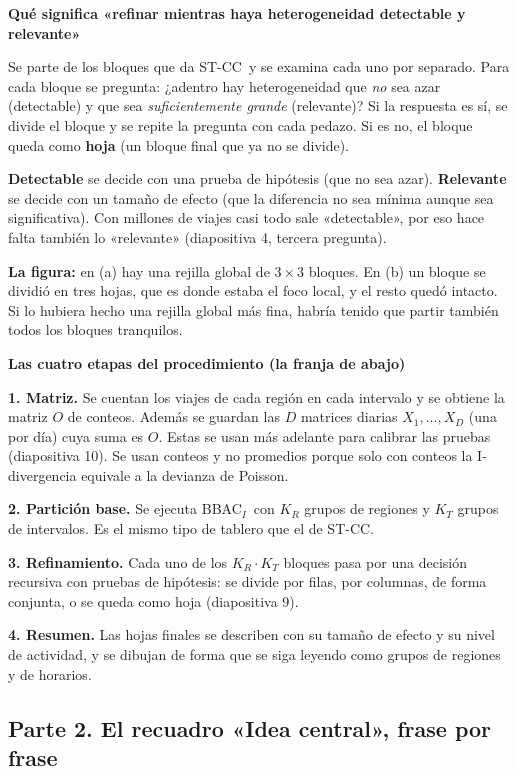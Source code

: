 \documentclass[11pt,a4paper]{article}
\newcommand{\cajainicio}[3]{\par\medskip\noindent
  \begin{lrbox}{\cajabox}\begin{minipage}{\dimexpr\linewidth-2\fboxsep-2\fboxrule\relax}%
  \textbf{\color{#1}#3}\par\smallskip}
\newcommand{\cajafin}[2]{\end{minipage}\end{lrbox}\fcolorbox{#1}{#2}{\usebox{\cajabox}}\par\medskip}
\newenvironment{nota}[1]{\cajainicio{acc}{acc!7}{#1}}{\cajafin{acc}{acc!7}}
\newcommand{\STCC}{ST-CC}
\newcommand{\BBAC}{BBAC$_I$}
\begin{document}
\begin{nota}{Qué significa «refinar mientras haya heterogeneidad detectable y relevante»}
Se parte de los bloques que da \STCC\ y se examina cada uno por separado. Para cada bloque se pregunta: ¿adentro hay heterogeneidad que \emph{no} sea azar (detectable) y que sea \emph{suficientemente grande} (relevante)? Si la respuesta es sí, se divide el bloque y se repite la pregunta con cada pedazo. Si es no, el bloque queda como \textbf{hoja} (un bloque final que ya no se divide).

\textbf{Detectable} se decide con una prueba de hipótesis (que no sea azar). \textbf{Relevante} se decide con un tamaño de efecto (que la diferencia no sea mínima aunque sea significativa). Con millones de viajes casi todo sale «detectable», por eso hace falta también lo «relevante» (diapositiva 4, tercera pregunta).

\textbf{La figura:} en (a) hay una rejilla global de $3\times3$ bloques. En (b) un bloque se dividió en tres hojas, que es donde estaba el foco local, y el resto quedó intacto. Si lo hubiera hecho una rejilla global más fina, habría tenido que partir también todos los bloques tranquilos.
\end{nota}

\begin{nota}{Las cuatro etapas del procedimiento (la franja de abajo)}
\textbf{1. Matriz.} Se cuentan los viajes de cada región en cada intervalo y se obtiene la matriz $O$ de conteos. Además se guardan las $D$ matrices diarias $X_1,\dots,X_D$ (una por día) cuya suma es $O$. Estas se usan más adelante para calibrar las pruebas (diapositiva 10). Se usan conteos y no promedios porque solo con conteos la I-divergencia equivale a la devianza de Poisson.

\textbf{2. Partición base.} Se ejecuta \BBAC\ con $K_R$ grupos de regiones y $K_T$ grupos de intervalos. Es el mismo tipo de tablero que el de \STCC.

\textbf{3. Refinamiento.} Cada uno de los $K_R\cdot K_T$ bloques pasa por una decisión recursiva con pruebas de hipótesis: se divide por filas, por columnas, de forma conjunta, o se queda como hoja (diapositiva 9).

\textbf{4. Resumen.} Las hojas finales se describen con su tamaño de efecto y su nivel de actividad, y se dibujan de forma que se siga leyendo como grupos de regiones y de horarios.
\end{nota}

\subsection*{Parte 2. El recuadro «Idea central», frase por frase}
\end{document}
